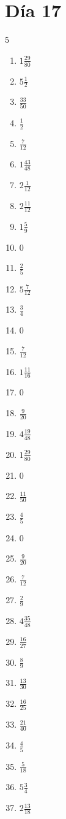 \documentclass[12pt]{article}
\begin{document}
\section*{Día 17}
\begin{multicols}{5}\begin{enumerate}
\item $ 1 \frac{29}{80} $
\item $ 5 \frac{1}{2} $
\item $ \frac{33}{50} $
\item $ \frac{1}{2} $
\item $ \frac{7}{12} $
\item $ 1 \frac{43}{48} $
\item $ 2 \frac{1}{12} $
\item $ 2 \frac{11}{12} $
\item $ 1 \frac{5}{9} $
\item $ 0 $
\item $ \frac{2}{5} $
\item $ 5 \frac{7}{12} $
\item $ \frac{3}{4} $
\item $ 0 $
\item $ \frac{7}{12} $
\item $ 1 \frac{11}{16} $
\item $ 0 $
\item $ \frac{9}{20} $
\item $ 4 \frac{19}{48} $
\item $ 1 \frac{29}{80} $
\item $ 0 $
\item $ \frac{11}{50} $
\item $ \frac{4}{5} $
\item $ 0 $
\item $ \frac{9}{20} $
\item $ \frac{7}{12} $
\item $ \frac{2}{9} $
\item $ 4 \frac{35}{48} $
\item $ \frac{16}{27} $
\item $ \frac{8}{9} $
\item $ \frac{13}{30} $
\item $ \frac{16}{25} $
\item $ \frac{21}{40} $
\item $ \frac{4}{5} $
\item $ \frac{5}{18} $
\item $ 5 \frac{3}{4} $
\item $ 2 \frac{13}{18} $

\end{enumerate}
\end{multicols}
\end{document}
